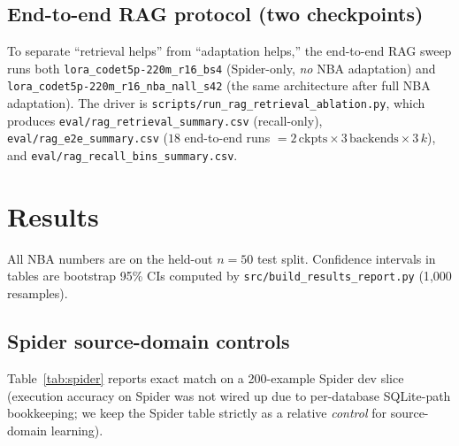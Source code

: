 \documentclass[11pt,a4paper]{article}
\newcommand{\bestckpt}{\texttt{lora\_codet5p-220m\_r16\_nba\_nall\_s42}}
\newcommand{\spiderckpt}{\texttt{lora\_codet5p-220m\_r16\_bs4}}
\begin{document}
\subsection{End-to-end RAG protocol (two checkpoints)}
\label{sec:methods-rag-protocol}

To separate ``retrieval helps'' from ``adaptation helps,'' the end-to-end
RAG sweep runs both
\spiderckpt{} (Spider-only, \emph{no} NBA adaptation) and
\bestckpt{} (the same architecture after full NBA adaptation). The driver is
\texttt{scripts/run\_rag\_retrieval\_ablation.py}, which produces
\texttt{eval/rag\_retrieval\_summary.csv} (recall-only),
\texttt{eval/rag\_e2e\_summary.csv} ($18$ end-to-end runs $=2\,\text{ckpts}\times
3\,\text{backends}\times 3\,k$), and
\texttt{eval/rag\_recall\_bins\_summary.csv}.

\section{Results}
\label{sec:results}

All NBA numbers are on the held-out $n=50$ test split. Confidence intervals
in tables are bootstrap 95\% CIs computed by
\texttt{src/build\_results\_report.py} (1{,}000 resamples).

\subsection{Spider source-domain controls}
\label{sec:spider-controls}

Table~\ref{tab:spider} reports exact match on a 200-example Spider dev slice
(execution accuracy on Spider was not wired up due to per-database
SQLite-path bookkeeping; we keep the Spider table strictly as a relative
\emph{control} for source-domain learning).
\end{document}
